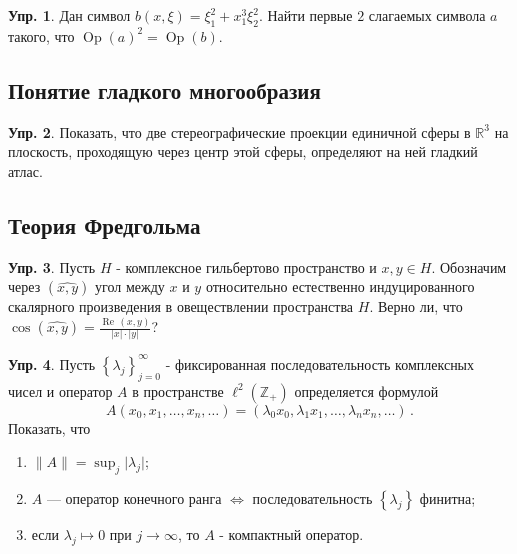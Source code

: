 \documentclass[a4paper, 12pt]{article}
\theoremstyle{definition}
\newtheorem{exercise}{Упр.}
\begin{document}
\begin{exercise}
    Дан символ \({ b(x, \xi) = \xi_1^2 + x_1^3 \xi_2^2 }\). Найти первые \({ 2 }\) слагаемых символа \({ a }\) такого, что \({ \operatorname{Op}(a)^2 = \operatorname{Op}(b) }\).
\end{exercise}

\subsection{Понятие гладкого многообразия} %

\begin{exercise}
    Показать, что две стереографические проекции единичной сферы в \({ \mathbb R^{3} }\) на плоскость, проходящую через центр этой сферы, определяют на ней гладкий атлас.
\end{exercise}

\subsection{Теория Фредгольма} %

\begin{exercise}
    Пусть \({ H }\) - комплексное гильбертово пространство и \({ x, y \in H }\).
    Обозначим через \({ (\widehat{x, y}) }\) угол между \({ x }\) и \({ y }\) относительно естественно индуцированного скалярного произведения в овеществлении пространства \({ H }\).
    Верно ли, что \({ \cos (\widehat{x, y}) = \frac{\operatorname{Re}\, (x, y)}{\lvert x \rvert \cdot \lvert y \rvert} }\)?
\end{exercise}

\begin{exercise}
    Пусть \({ \left\{ \lambda_j \right\}_{j=0}^{\infty} }\) - фиксированная последовательность комплексных чисел и оператор \({ A }\) в пространстве \({ \ell^2(\mathbb Z_{+}) }\) определяется формулой \[
        A(x_0, x_1, \ldots, x_n, \ldots) = (\lambda_0 x_0, \lambda_1 x_1, \ldots, \lambda_n x_n, \ldots)\,.
    \] Показать, что
    \begin{enumerate}
        \item \({ \lVert A \rVert = \sup_{j} \lvert \lambda_j \rvert }\);
        \item \({ A }\) --- оператор конечного ранга \({ \iff }\) последовательность \({ \left\{ \lambda_j \right\} }\) финитна;
        \item если \({ \lambda_j \mapsto 0 }\) при \({ j \to \infty }\), то \({ A }\) - компактный оператор.
    \end{enumerate}
\end{exercise}
\end{document}
